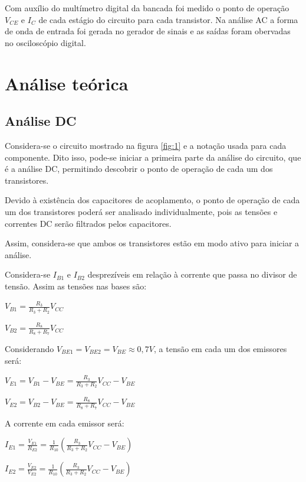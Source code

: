 Com auxílio do multímetro digital da bancada foi medido o ponto de operação $V_{CE}$ e $I_C$ de cada estágio do circuito para cada transistor. Na análise AC a forma de onda de entrada foi gerada no gerador de sinais e as saídas foram obervadas no osciloscópio digital.


\section{Análise teórica}

\subsection{Análise DC}

Considera-se o circuito mostrado na figura \ref{fig:1} e a notação usada para cada componente. Dito isso, pode-se iniciar a primeira parte da análise do circuito, que é a análise DC, permitindo descobrir o ponto de operação de cada um dos transistores.

Devido à existência dos capacitores de acoplamento, o ponto de operação de cada um dos transistores poderá ser analisado individualmente, pois as tensões e correntes DC serão filtrados pelos capacitores.

Assim, considera-se que ambos os transistores estão em modo ativo para iniciar a análise.

Considera-se $I_{B1}$ e $I_{B2}$ desprezíveis em relação à corrente que passa no divisor de tensão. Assim as tensões nas bases são:

\begin{center}
    $V_{B1} = \frac{R_3}{R_3 + R_2}V_{CC}$  
    
    $V_{B2} = \frac{R_8}{R_8 + R_7}V_{CC}$
\end{center}

Considerando $V_{BE1}=V_{BE2}=V_{BE} \approx 0,7V$, a tensão em cada um dos emissores será:

\begin{center}
    $V_{E1} = V_{B1} - V_{BE} = \frac{R_3}{R_3 + R_2}V_{CC} - V_{BE}$
    
    $V_{E2} = V_{B2} - V_{BE} = \frac{R_8}{R_8 + R_7}V_{CC} - V_{BE}$
\end{center}

A corrente em cada emissor será:

\begin{center}
    $I_{E1} = \frac{V_{E1}}{R_{E2}} = \frac{1}{R_{10}} \left(\frac{R_3}{R_3 + R_2}V_{CC} - V_{BE} \right)$
    
    $I_{E2} = \frac{V_{E2}}{V_{E2}} = \frac{1}{R_{10}} \left(\frac{R_3}{R_3 + R_2}V_{CC} - V_{BE} \right)$
\end{center}

